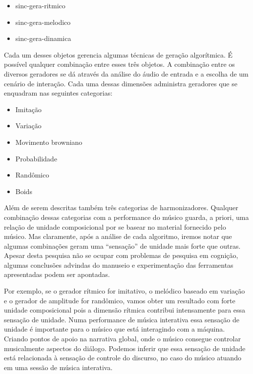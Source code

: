 \documentclass{ppgmus}
\begin{document}
\begin{itemize}
 \item   sinc-gera-ritmico
 \item   sinc-gera-melodico
 \item   sinc-gera-dinamica
\end{itemize}

Cada um desses objetos gerencia algumas técnicas de geração
algorítmica. É possível qualquer combinação entre esses três objetos.
A combinação entre os diversos geradores se dá através da 
análise do áudio de entrada e a escolha de um cenário de interação. 
Cada uma dessas dimensões administra geradores que se enquadram nas seguintes
categorias:

\begin{itemize}
 \item   Imitação
 \item   Variação
 \item   Movimento browniano
 \item   Probabilidade
 \item   Randômico
 \item   Boids
\end{itemize}

Além de serem descritas também três categorias de harmonizadores.
Qualquer combinação dessas categorias com a performance do músico guarda, a priori,  
uma relação de unidade composicional por se basear no material fornecido pelo músico.
Mas claramente, após a análise de cada algoritmo, iremos notar que algumas combinações 
geram uma ``sensação'' de unidade mais forte que outras. Apesar desta pesquisa
não se ocupar com problemas de pesquisa em cognição, algumas conclusões advindas
do manuseio e experimentação das ferramentas apresentadas podem ser apontadas.

Por exemplo, se o gerador rítmico for imitativo, o melódico baseado em
variação e o gerador de amplitude for randômico, vamos obter um resultado
com forte unidade composicional pois a dimensão rítmica contribui intensamente
para essa sensação de unidade. Numa performance de música interativa essa sensação
de unidade é importante para o músico que está interagindo com a máquina. Criando
pontos de apoio na narrativa global, onde o músico consegue controlar musicalmente 
aspectos do diálogo. Podemos inferir que essa sensação de unidade está relacionada
à sensação de controle do discurso, no caso do músico atuando em uma sessão de música
interativa.

% 
% 
\end{document}
